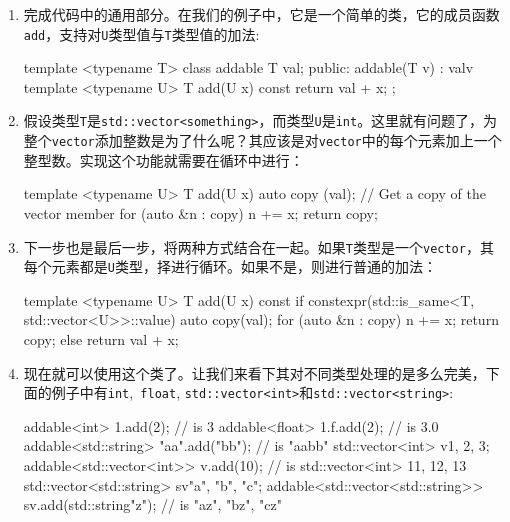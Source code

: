 \begin{enumerate}
\item 完成代码中的通用部分。在我们的例子中，它是一个简单的类，它的成员函数\texttt{add}，支持对\texttt{U}类型值与\texttt{T}类型值的加法:

\begin{codebox}[cpp]
template <typename T>
class addable
{
  T val;
public:
  addable(T v) : val{v} {}
  template <typename U>
  T add(U x) const {
    return val + x;
  }
};
\end{codebox}

\item 假设类型\texttt{T}是\texttt{std::vector<something>}，而类型\texttt{U}是\texttt{int}。这里就有问题了，为整个\texttt{vector}添加整数是为了什么呢？其应该是对\texttt{vector}中的每个元素加上一个整型数。实现这个功能就需要在循环中进行：

\begin{codebox}[cpp]
template <typename U>
T add(U x)
{
  auto copy (val); // Get a copy of the vector member
  for (auto &n : copy) {
    n += x;
  }
  return copy;
}
\end{codebox}

\item 下一步也是最后一步，将两种方式结合在一起。如果\texttt{T}类型是一个\texttt{vector}，其每个元素都是\texttt{U}类型，择进行循环。如果不是，则进行普通的加法：

\begin{codebox}[cpp]
template <typename U>
T add(U x) const{
    if constexpr(std::is_same<T, std::vector<U>>::value){
        auto copy(val);
        for (auto &n : copy){
            n += x;
        }
        return copy;
    } else {
        return val + x;
    }
}
\end{codebox}

\item 现在就可以使用这个类了。让我们来看下其对不同类型处理的是多么完美，下面的例子中有\texttt{int},\texttt{ float}, \texttt{std::vector<int>}和\texttt{std::vector<string>}:

\begin{codebox}[cpp]
addable<int> {1}.add(2); // is 3
addable<float> {1.f}.add(2); // is 3.0
addable<std::string> {"aa"}.add("bb"); // is "aabb"
std::vector<int> v{1, 2, 3};
addable<std::vector<int>> {v}.add(10); // is std::vector<int> {11, 12, 13}
std::vector<std::string> sv{"a", "b", "c"};
addable<std::vector<std::string>> {sv}.add(std::string{"z"}); // is {"az", "bz", "cz"}
\end{codebox}

\end{enumerate}

